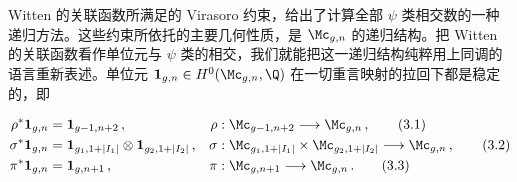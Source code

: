 
Witten 的关联函数所满足的 Virasoro 约束，给出了计算全部 $\psi$ 类相交数的一种递归方法。这些约束所依托的主要几何性质，是 $\Mc_{g,n}$ 的递归结构。把 Witten 的关联函数看作单位元与 $\psi$ 类的相交，我们就能把这一递归结构纯粹用上同调的语言重新表述。单位元 $\mathbf{1}_{g,n}\in H^{0}(\Mc_{g,n},\Q)$ 在一切重言映射的拉回下都是稳定的，即

\begin{align}
  \rho^{*}\mathbf{1}_{g,n} &= \mathbf{1}_{g-1,n+2}\,, & \rho &:\Mc_{g-1,n+2}\longrightarrow\Mc_{g,n}\,, \tag{3.1}\\
  \sigma^{*}\mathbf{1}_{g,n} &= \mathbf{1}_{g_{1},1+|I_{1}|}\otimes\mathbf{1}_{g_{2},1+|I_{2}|}\,, & \sigma &:\Mc_{g_{1},1+|I_{1}|}\times\Mc_{g_{2},1+|I_{2}|}\longrightarrow\Mc_{g,n}\,, \tag{3.2}\\
  \pi^{*}\mathbf{1}_{g,n} &= \mathbf{1}_{g,n+1}\,, & \pi &:\Mc_{g,n+1}\longrightarrow\Mc_{g,n}\,. \tag{3.3}
\end{align}


